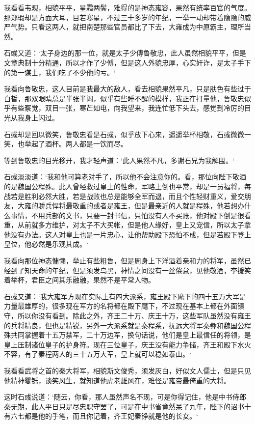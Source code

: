 我看看韦观，相貌平平，星霜两鬓，难得的是神态雍容，果然有统率百官的气度。那郑瑕却是方面大耳，目若寒星，不过三十多岁的年纪，一举一动却带着隐隐的威严气势。只看这两人，就把南楚那些官员都比了下去，大雍成为中原霸主，理所当然。

石彧又道：‘太子身边的那一位，就是太子少傅鲁敬忠，此人虽然相貌平平，但是文章典制十分精通，所以才作了少傅，但是这人外貌忠厚，心实奸诈，是太子手下的第一谋士，我们吃了不少他的亏。‘

我看向鲁敬忠，这人目前是我最大的敌人，看去相貌果然平凡，只是肤色有些过于白皙，那双眼睛总是半张半阖，似乎有些睡不醒的模样，我正在打量他，鲁敬忠似乎有些察觉，双目一张，寒芒如电，向我望来，我连忙低下头去，感觉到冷厉的目光从我身上闪过。

石彧却是回以微笑，鲁敬忠看是石彧，似乎放下心来，遥遥举杯相敬，石彧微微一笑，也举起了酒杯。两人都是一饮而尽。

等到鲁敬忠的目光移开，我才轻声道：‘此人果然不凡，多谢石兄为我解围。‘

石彧淡淡道：‘我和他可算老对手了，所以他不会注意你的。看，那位向陛下敬酒的是魏国公程殊。此人曾经救过皇上的性命，军略上倒也平常，却是一员福将，每战若是胜利必然大胜，若是战败也总是能够全军而退，而且个性轻财重义，爱交朋友，大雍的骄兵悍将最敬重的或者是雍王，但是最亲近的人就是程殊，他若想办什么事情，不用兵部的文书，只要一封书信，只怕没有人不买账，他对殿下倒是很看重，从前就多方维护，对太子不大买帐，但是他人缘好，皇上又宠信，所以太子拿他没有办法。这人对皇上也是一片忠心，让他帮助殿下恐怕不成，但是若殿下登上皇位，他必然是乐观其成。‘

我看向那位神态慵懒，举止有些粗鲁，但是周身上下洋溢着亲和力的将军，虽然已经到了知天命的年纪，但是须发乌黑，神情之间没有一丝倦怠，见他敬酒，李援笑着举杯，君臣之间其乐融融，果然不是平常人物。

石彧又道：‘我大雍军方现在实际上有四大派系，雍王殿下麾下的四十五万大军是力量最雄厚的，很多现在军方的名将都在殿下麾下，不过现在基本上都在外面镇守，所以你没有看到。除此之外，齐王二十万、庆王十万，这些军队虽然没有雍王的兵将精良，但也是精锐，另外一大派系就是秦程系，抚远大将军秦彝和魏国公程殊共同掌握着十五万禁军，二十万边军，换句话说，他们是皇上最信任的将领，是皇上压制诸位皇子的护身符。现在三位皇子，庆王没有能力争储，齐王和殿下水火不容，有了秦程两人的三十五万大军，皇上就可以稳如泰山。‘

我看看武将之首的秦大将军，相貌斯文俊秀，须发灰白，好似文人儒士，但是只见他精神矍铄，谈笑风生，就知道他虎老雄风在，难怪是雍帝最倚重的大将。

这时石彧说道：‘随云，你看，那人虽然声名不现，可是你得记住，他是中书侍郎秦无期，此人平日只是尽忠职守罢了，可是在中书省竟然呆了九年，陛下的诏书十有六七都是他的手笔，而且你记着，齐王妃秦铮就是他的长女。‘

